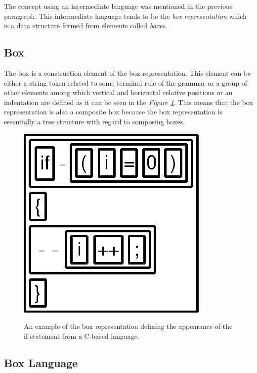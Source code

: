 \documentclass[12pt,notitlepage,a4paper]{report}
\begin{document}
The concept using an intermediate language  was mentioned  in the previous paragraph. This intermediate language tends to be the \textit{box representation} which is a data structure formed from elements called \textit{boxes}.

\subsection{Box}

The box is a construction element of the box representation. This element can be either a string token related to some terminal rule of the grammar or a group of other elements among which vertical and horizontal relative positions or an indentation are defined  as it can be seen in the \textit{Figure \ref{BoxExample}}. This means that the box representation is also a composite box because the box representation is essentially a tree structure with regard to composing boxes.

\begin{figure}[h!]
\centering
\caption{An example of the box representation defining the appearance of the if statement from a C-based language.}
\includegraphics[scale=0.65]{pictures/BoxRepresentation.eps}
\label{BoxExample}
\end{figure}
\noindent

\subsection{Box Language}
\end{document}
